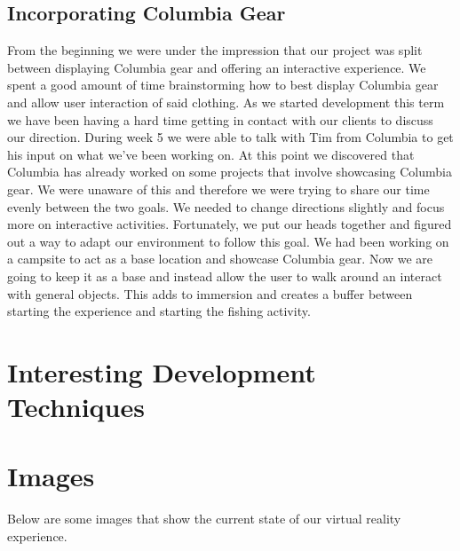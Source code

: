 \documentclass[10pt,journal,compsoc,onecolumn, draftclsnofoot]{IEEEtran}
\begin{document}
\subsection{Incorporating Columbia Gear}
From the beginning we were under the impression that our project was split between displaying Columbia gear and offering an interactive experience.
We spent a good amount of time brainstorming how to best display Columbia gear and allow user interaction of said clothing.
As we started development this term we have been having a hard time getting in contact with our clients to discuss our direction.
During week 5 we were able to talk with Tim from Columbia to get his input on what we’ve been working on.
At this point we discovered that Columbia has already worked on some projects that involve showcasing Columbia gear.
We were unaware of this and therefore we were trying to share our time evenly between the two goals.
We needed to change directions slightly and focus more on interactive activities.
Fortunately, we put our heads together and figured out a way to adapt our environment to follow this goal.
We had been working on a campsite to act as a base location and showcase Columbia gear.
Now we are going to keep it as a base and instead allow the user to walk around an interact with general objects.
This adds to immersion and creates a buffer between starting the experience and starting the fishing activity.


\section{Interesting Development Techniques}

\section{Images}
Below are some images that show the current state of our virtual reality experience.
\end{document}
